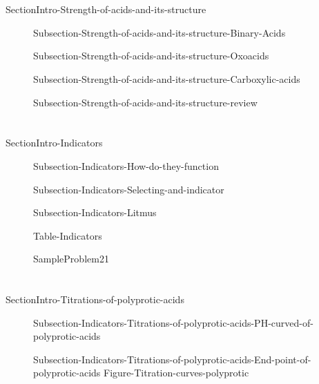 \documentclass[main.tex]{subfiles}
\begin{document}
 \section{\color{blue!30!black}{Molecular mechanisms behind acid-base strength}}{SectionIntro-Strength-of-acids-and-its-structure}
\sloppy\begin{description}
\item[] {Subsection-Strength-of-acids-and-its-structure-Binary-Acids}
\item[] {Subsection-Strength-of-acids-and-its-structure-Oxoacids}
\item[] {Subsection-Strength-of-acids-and-its-structure-Carboxylic-acids}
\item[] {Subsection-Strength-of-acids-and-its-structure-review}
 \end{description}

  \section{\color{blue!30!black}{Indicators}}{SectionIntro-Indicators}
\sloppy\begin{description}
\item[] {Subsection-Indicators-How-do-they-function}
\item[] {Subsection-Indicators-Selecting-and-indicator}
   \item[] {Subsection-Indicators-Litmus}

  \vspace{3cm} \hspace{-4cm} {Table-Indicators} 

   {SampleProblem21}

 \end{description}
 
 
  \section{\color{blue!30!black}{Titrations of polyprotic acids}}{SectionIntro-Titrations-of-polyprotic-acids}
\sloppy\begin{description}
\item[] {Subsection-Indicators-Titrations-of-polyprotic-acids-PH-curved-of-polyprotic-acids}
\item[] {Subsection-Indicators-Titrations-of-polyprotic-acids-End-point-of-polyprotic-acids}
  {Figure-Titration-curves-polyprotic}

 \end{description}
 
\end{document}
